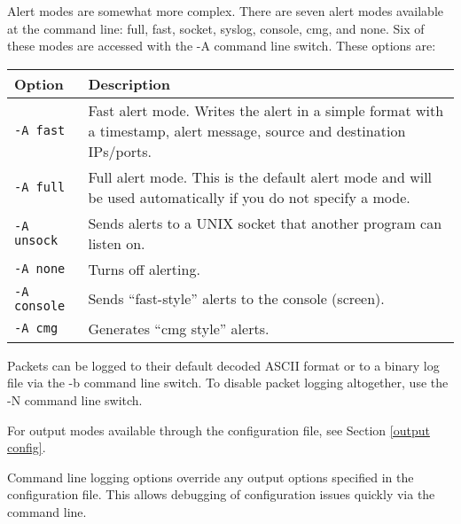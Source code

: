\documentclass[english]{report}
\newenvironment{note}{
\samepage
    \vspace{10pt}{\textsf{
        {\hspace{7pt}\Huge{$\triangle$\hspace{-12.5pt}{\Large{$^!$}}}}\hspace{5pt}
        {\Large{NOTE}}
    }
    }
   \begin{center}
    \par\vspace{-17pt}

    \begin{lrbox}{\savepar}
    \begin{minipage}[r]{6in}
}
{
    \end{minipage}
    \end{lrbox}
    \fbox{
        \usebox{
            \savepar
	}
    }
    \par\vskip10pt
    \end{center}
}
\newenvironment{note}{
        \begin{rawhtml}
        <p><table border="1"><tr><td><b>
        Note:&nbsp;&nbsp;</b>
        \end{rawhtml}
}{
        \begin{rawhtml}
        </b></td></tr></table></p>
        \end{rawhtml}
}
\begin{document}
Alert modes are somewhat more complex. There are seven alert modes available at
the command line: full, fast, socket, syslog, console, cmg, and none. Six of
these modes are accessed with the -A command line switch.  These options are:

\begin{center}
\begin{tabular}{| l | p{5.4in} |}

\hline
{\bf Option} & {\bf Description}\\
\hline

\hline
{\tt -A fast} &

Fast alert mode. Writes the alert in a simple format with a timestamp, alert
message, source and destination IPs/ports.\\

\hline
{\tt -A full} &

Full alert mode. This is the default alert mode and will be used automatically
if you do not specify a mode.\\

\hline
{\tt -A unsock} &

Sends alerts to a UNIX socket that another program can listen on.\\

\hline
{\tt -A none} &

Turns off alerting.\\

\hline
{\tt -A console} &

Sends ``fast-style'' alerts to the console (screen).\\

\hline
{\tt -A cmg} &

Generates ``cmg style'' alerts.\\

\hline
\end{tabular}
\end{center}

Packets can be logged to their default decoded ASCII format or to a binary log
file via the -b command line switch. To disable packet logging altogether, use
the -N command line switch.

For output modes available through the configuration file, see Section
\ref{output config}.

\begin{note}

Command line logging options override any output options specified in the
configuration file. This allows debugging of configuration issues quickly via
the command line.

\end{note}
\end{document}
